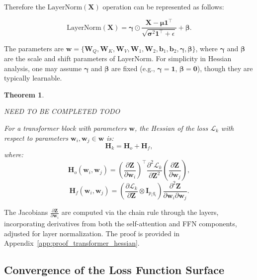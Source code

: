 \documentclass{article}
\newtheorem{theorem}{Theorem} %
\begin{document}
Therefore the $\text{LayerNorm}(\mathbf{X})$ operation can be represented as follows:

\[
\text{LayerNorm}(\mathbf{X}) = \mathbf{\gamma} \odot \frac{\mathbf{X} - \mathbf{\mu} \mathbf{1}^\top}{\sqrt{\mathbf{\sigma}^2\mathbf{1}^\top + \epsilon}} + \mathbf{\beta}.
\]

The parameters are \( \mathbf{w} = \{\mathbf{W}_Q, \mathbf{W}_K, \mathbf{W}_V, \mathbf{W}_1, \mathbf{W}_2, \mathbf{b}_1, \mathbf{b}_2, \mathbf{\gamma}, \mathbf{\beta}\} \), where \(\mathbf{\gamma}\) and \(\mathbf{\beta}\) are the scale and shift parameters of LayerNorm. For simplicity in Hessian analysis, one may assume \(\mathbf{\gamma}\) and \(\mathbf{\beta}\) are fixed (e.g., \(\mathbf{\gamma} = \mathbf{1}\), \(\mathbf{\beta} = \mathbf{0}\)), though they are typically learnable. 

\begin{theorem}\label{thm:transformer_hessian}

NEED TO BE COMPLETED TODO

For a transformer block with parameters \( \mathbf{w} \), the Hessian of the loss \( \mathcal{L}_k \) with respect to parameters \( \mathbf{w}_i, \mathbf{w}_j \in \mathbf{w} \) is:
\[
\mathbf{H}_k = \mathbf{H}_o + \mathbf{H}_f,
\]
where:
\[
\mathbf{H}_o(\mathbf{w}_i, \mathbf{w}_j) = \left( \frac{\partial \mathbf{Z}}{\partial \mathbf{w}_i} \right)^\top \frac{\partial^2 \mathcal{L}_k}{\partial \mathbf{Z}^2} \left( \frac{\partial \mathbf{Z}}{\partial \mathbf{w}_j} \right),
\]
\[
\mathbf{H}_f(\mathbf{w}_i, \mathbf{w}_j) = \left( \frac{\partial \mathcal{L}_k}{\partial \mathbf{Z}} \otimes \mathbf{I}_{p_i q_i} \right) \frac{\partial^2 \mathbf{Z}}{\partial \mathbf{w}_i \partial \mathbf{w}_j}.
\]
\end{theorem}

The Jacobians \( \frac{\partial \mathbf{Z}}{\partial \mathbf{w}_i} \) are computed via the chain rule through the layers, incorporating derivatives from both the self-attention and FFN components, adjusted for layer normalization. The proof is provided in Appendix~\ref{app:proof_transformer_hessian}.

\subsection{Convergence of the Loss Function Surface}\label{subsec:loss_convergence}
\end{document}
